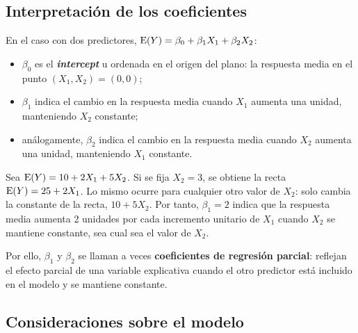 \subsection{Interpretación de los coeficientes}

En el caso con dos predictores, $\operatorname{E}(Y)=\beta_0+\beta_1X_1+\beta_2X_2$:
\begin{itemize}
  \item $\beta_0$ es el \textbf{\emph{intercept}} u ordenada en el origen del plano: la respuesta media
    en el punto $(X_1,X_2)=(0,0)$;
  \item $\beta_1$ indica el cambio en la respuesta media cuando $X_1$ aumenta una unidad,
    manteniendo $X_2$ constante;
  \item análogamente, $\beta_2$ indica el cambio en la respuesta media cuando $X_2$ aumenta una
    unidad, manteniendo $X_1$ constante.
\end{itemize}

\begin{ejemplo}
  Sea $\operatorname{E}(Y)=10+2X_1+5X_2$. Si se fija $X_2=3$, se obtiene la recta $\operatorname{E}(Y)=25+2X_1$. Lo mismo
  ocurre para cualquier otro valor de $X_2$: solo cambia la constante de la recta, $10+5X_2$.
  Por tanto, $\beta_1=2$ indica que la respuesta media aumenta 2 unidades por cada incremento
  unitario de $X_1$ cuando $X_2$ se mantiene constante, sea cual sea el valor de $X_2$.
\end{ejemplo}

Por ello, $\beta_1$ y $\beta_2$ se llaman a veces \textbf{coeficientes de regresión parcial}:
reflejan el efecto parcial de una variable explicativa cuando el otro predictor está incluido en el
modelo y se mantiene constante.

\subsection{Consideraciones sobre el modelo}

